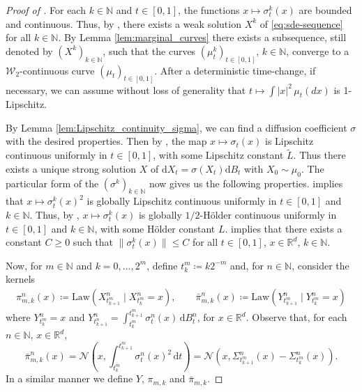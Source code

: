 \documentclass[12pt,oneside]{amsart}
\theoremstyle{definition}
\newcommand{\Law}{\mathrm{Law}}
\newcommand{\D}{\mathrm{d}}
\newcommand{\N}{\mathbb N}
\newcommand{\R}{\mathbb R}
\def\R{{\mathbb R}}
\numberwithin{equation}{section}
\begin{document}
\begin{proof}[Proof of ]
	For each $k \in \N$ and $t \in [0, 1]$, the functions $x \mapsto \sigma^k_t(x)$ are bounded and continuous. Thus, by \cite[Theorem 6.1.7]{StVa79}, there exists a weak solution $X^k$ of \eqref{eq:sde-sequence} for all $k \in \N$.
    By Lemma \ref{lem:marginal_curves} there exists a subsequence, still denoted by $(X^k)_{k \in \N}$, such that the curves $(\mu^k_t)_{t \in [0,1]}$, $k \in \N$, converge to a $\mathcal W_2$-continuous curve $(\mu_t)_{t \in [0,1]}$.
    After a deterministic time-change, if necessary, we can assume without loss of generality that $t \mapsto \int |x|^2 \, \mu_t(dx)$ is 1-Lipschitz.
    
    By Lemma \ref{lem:Lipschitz_continuity_sigma}, we can find a diffusion coefficient $\sigma$ with the desired properties. Then by , the map $x \mapsto \sigma_t(x)$ is Lipschitz continuous uniformly in $t \in [0,1]$, with some Lipschitz constant $\tilde L$. Thus there exists a unique strong solution $X$ of $\D X_t = \sigma(X_t) \D B_t$ with $X_0 \sim \mu_0$.
    The particular form of the $(\sigma^k)_{k \in \N}$ now gives us the following properties.  implies that $x \mapsto \sigma^k_t(x)^2$ is globally Lipschitz continuous uniformly in $t \in [0, 1]$ and $k \in \N$. Thus, by , $x \mapsto \sigma^k_t(x)$ is globally $1/2$-H\"older continuous uniformly in $t \in [0,1]$ and $k \in \N$, with some H\"older constant $L$.
     implies that there exists a constant $C \geq 0$ such that $\|\sigma_t^k(x)\| \leq C$ for all $t \in [0, 1]$, $x \in \R^d$, $k \in \N$.
    
    Now, for $m \in \N$ and $k = 0,\ldots,2^m$, define $t_k^m \coloneqq k 2^{-m}$ and, for $n \in \N$, consider the kernels
\begin{align}
    \pi_{m,k}^{n}(x) \coloneqq \Law( X^{n}_{t^m_{k+1}} \mid X^{n}_{t^m_k} = x),
    \qquad \bar \pi_{m,k}^{n}(x) \coloneqq \Law( Y^{n}_{t^m_{k+1}} \mid Y^{n}_{t^m_k} = x )
\end{align}
where $Y^{n}_{t^m_k} = x$ and $Y^{n}_{t^n_{k + 1}} = \int_{t^m_k}^{t^{m}_{k + 1}}\sigma_t^{n}(x) \, \D B^n_t$, for $x \in \R^d$.
Observe that, for each $n \in \N$, $x \in \R^d$,
\begin{equation}
    \label{eq:bar_pi_normal_distribution}
    \bar \pi^{n}_{m,k}(x) = \mathcal N\!\left(x, \int_{t^m_k}^{t^m_{k+1}} \sigma_t^{n}(x)^2 \, \D t \right)\! = \mathcal N\!\left(x, \Sigma_{t^m_{k+1}}^{n}(x) - \Sigma_{t^m_k}^{n}(x) \right)\!. 
\end{equation}
In a similar manner we define $Y$, $\pi_{m,k}$ and $\bar \pi_{m,k}$.


\end{proof}
\end{document}
